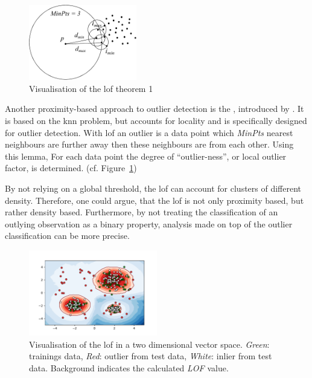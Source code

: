 \begin{figure}
	\centering
	\vspace{-10pt}
	\includegraphics[width=0.42\textwidth,keepaspectratio]{figures/200-breuning2000-figure3.pdf}
	\caption[Visualisation of the LOF theorem 1]{Visualisation of the \gls{lof} theorem 1 \parencite[p.~97]{Breunig2000}}
	\label{fig:background:network:novelty:lof-theorem}
\end{figure}

Another proximity-based approach to outlier detection is the , introduced by \textcite{Breunig2000}. It is based on the \gls{knn} problem, but accounts for locality and is specifically designed for outlier detection.
With \gls{lof} an outlier is a data point which \emph{MinPts} nearest neighbours are further away then these neighbours are from each other. 
Using this lemma, For each data point the degree of \enquote{outlier-ness}, or local outlier factor, is determined. (cf. Figure~\ref{fig:background:network:novelty:lof-theorem})

By not relying on a global threshold, the \gls{lof} can account for clusters of different density. Therefore, one could argue, that the \gls{lof} is not only proximity based, but rather density based. Furthermore, by not treating the classification of an outlying observation as a binary property, analysis made on top of the outlier classification can be more precise. \parencite{Breunig2000}

\newpage
\begin{figure}
	\centering
	\vspace{-5pt}
	\includegraphics[width=0.5\textwidth,trim={12mm 5mm 15mm 10mm},keepaspectratio,clip]{figures/200-background-lof.pdf}
	\caption[Example visualisation of the LOF]{Visualisation of the \gls{lof} in a two dimensional vector space. \emph{Green}: trainings data, \emph{Red}: outlier from test data, \emph{White}: inlier from test data. Background indicates the calculated \emph{LOF} value.}
	\label{fig:background:network:novelty:lof}
	\vspace{-25pt}
\end{figure}

